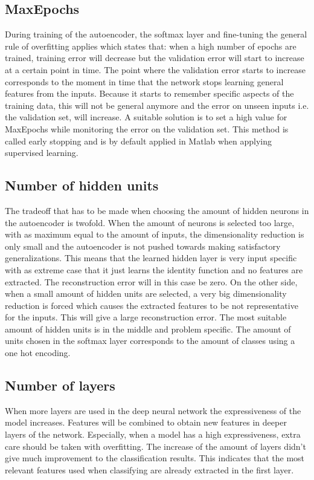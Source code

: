 \documentclass[a4paper,10pt]{article}
\begin{document}
\subsection{MaxEpochs}
During training of the autoencoder, the softmax layer and fine-tuning the general rule of overfitting applies which states that: when a high number of epochs are trained, training error will decrease but the validation error will start to increase at a certain point in time. The point where the validation error starts to increase corresponds to the moment in time that the network stops learning general features from the inputs. Because it starts to remember specific aspects of the training data, this will not be general anymore and the error on unseen inputs i.e. the validation set, will increase. A suitable solution is to set a high value for MaxEpochs while monitoring the error on the validation set. This method is called early stopping and is by default applied in Matlab when applying supervised learning. 

\subsection{Number of hidden units}
The tradeoff that has to be made when choosing the amount of hidden neurons in the autoencoder is twofold. When the amount of neurons is selected too large, with as maximum equal to the amount of inputs, the dimensionality reduction is only small and the autoencoder is not pushed towards making satisfactory generalizations. This means that the learned hidden layer is very input specific with as extreme case that it just learns the identity function and no features are extracted. The reconstruction error will in this case be zero. On the other side, when a small amount of hidden units are selected, a very big dimensionality reduction is forced which causes the extracted features to be not representative for the inputs. This will give a large reconstruction error. The most suitable amount of hidden units is in the middle and problem specific. The amount of units chosen in the softmax layer corresponds to the amount of classes using a one hot encoding.

\subsection{Number of layers}
When more layers are used in the deep neural network the expressiveness of the model increases. Features will be combined to obtain new features in deeper layers of the network. Especially, when a model has a high expressiveness, extra care should be taken with overfitting. The increase of the amount of layers didn't give much improvement to the classification results. This indicates that the most relevant features used when classifying are already extracted in the first layer.\\ 
\end{document}
